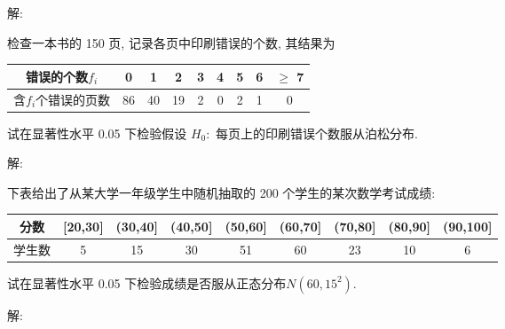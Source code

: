 \documentclass[standard]{ExBook}
\begin{document}
\begin{qitems}
    \begin{bbox}
解: 
    \end{bbox}

\vspace{-5em}

    \begin{bbox}
    \begin{shaded}
        \qitem
检查一本书的 150 页, 记录各页中印刷错误的个数, 其结果为
\begin{center}
\setlength{\tabcolsep}{17pt}
\begin{tabular}{c|cccccccc}
\hline
错误的个数$f_i$ & 0 & 1 & 2 & 3 & 4 & 5 & 6 & $\geq$ 7 \\
\hline
含$f_i$个错误的页数 & 86 & 40 & 19 & 2 & 0 & 2 & 1 & 0 \\
\hline
\end{tabular}
\end{center}
试在显著性水平 0.05 下检验假设 $H_0 : $ 每页上的印刷错误个数服从泊松分布.
    \end{shaded}
    \end{bbox}

\vspace{-5em}

    \begin{bbox}
解: 
    \end{bbox}

\vspace{-5em}

    \begin{bbox}
    \begin{shaded}
        \qitem
下表给出了从某大学一年级学生中随机抽取的 200 个学生的某次数学考试成绩:
\begin{center}
\setlength{\tabcolsep}{9pt}
\begin{tabular}{c|cccccccc}
\hline
分数 & [20,30] & (30,40] & (40,50] & (50,60] & (60,70] & (70,80] & (80,90] & (90,100] \\
\hline
学生数 & 5 & 15 & 30 & 51 & 60 & 23 & 10 & 6 \\
\hline
\end{tabular}
\end{center}
试在显著性水平 0.05 下检验成绩是否服从正态分布$N(60,15^2)$.
    \end{shaded}
    \end{bbox}

\vspace{-5em}

    \begin{bbox}
解: 
    \end{bbox}
\end{qitems}
\end{document}
